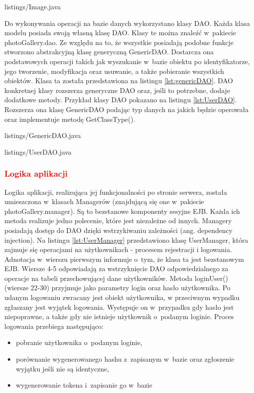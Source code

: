 
{listings/Image.java}

Do wykonywania operacji na bazie danych wykorzystano klasy DAO. Każda klasa
modelu posiada swoją własną klasę DAO. Klasy te można znaleźć w~pakiecie
photoGallery.dao. Ze względu na to, że wszystkie posiadają podobne funkcje
stworzono abstrakcyjną klasę generyczną GenericDAO. Dostarcza ona podstawowych
operacji takich jak wyszukanie w~bazie obiektu po identyfikatorze, jego
tworzenie, modyfikacja oraz usuwanie, a także pobieranie wszystkich obiektów. Klasa ta została przedstawiona na listingu
\ref{lst:genericDAO}. DAO konkretnej klasy rozszerza generyczne DAO oraz, jeśli
to potrzebne, dodaje dodatkowe metody. Przykład klasy DAO pokazano na listingu \ref{lst:UserDAO}. Rozszerza ona klasę GenericDAO podając typ danych na jakich będzie operowała oraz implementuje metodę GetClassType().

\newpage

{listings/GenericDAO.java}


{listings/UserDAO.java}

\subsubsection{\textcolor{red}{Logika aplikacji}}
Logika aplikacji, realizująca jej funkcjonalności po stronie serwera, została umieszczona w~klasach Managerów (znajdującą się one w~pakiecie photoGallery.manager). Są to bezstanowe komponenty sesyjne EJB. Każda ich metoda realizuje jedno polecenie, które jest niezależne od innych. Managery posiadają dostęp do DAO dzięki wstrzykiwaniu zależności (ang. dependency injection). Na listingu
\ref{lst:UserManager} przedstawiono klasę UserManager, która zajmuje się
operacjami na użytkownikach - procesem rejestracji i logowania. Adnotacja w~wierszu pierwszym informuje o~tym, że klasa ta
jest bezstanowym EJB. Wiersze 4-5 odpowiadają za wstrzyknięcie DAO
odpowiedzialnego za operacje na tabeli przechowującej dane użytkowników.
Metoda loginUser() (wiersze 22-30) przyjmuje jako parametry login oraz
hasło użytkownika. Po udanym logowaniu zwracany jest obiekt użytkownika, w
przeciwnym wypadku zgłaszany jest wyjątek logowania. Występuje on w~przypadku
gdy hasło jest niepoprawne, a także gdy nie istnieje użytkownik o~podanym loginie. Proces logowania przebiega następująco:
\begin{itemize}
	\item pobranie użytkownika o~podanym loginie,
	\item porównanie wygenerowanego hashu z~zapisanym w~bazie oraz zgłoszenie wyjątku jeśli nie są identyczne,
	\item wygenerowanie tokena i~zapisanie go w~bazie
\end{itemize}

